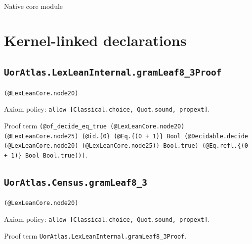 \documentclass[11pt]{article}
\begin{document}
\begin{center}{\LARGE Native core module}\end{center}
\section*{Kernel-linked declarations}
\subsection*{\texttt{UorAtlas.LexLeanInternal.gramLeaf8\_3Proof}}
\noindent\texttt{(@LexLeanCore.node20)}\par
\noindent Axiom policy: \texttt{allow [Classical.choice, Quot.sound, propext]}.\par
\noindent Proof term \texttt{(@of\_decide\_eq\_true (@LexLeanCore.node20) (@LexLeanCore.node25) (@id.\{0\} (@Eq.\{(0 + 1)\} Bool (@Decidable.decide (@LexLeanCore.node20) (@LexLeanCore.node25)) Bool.true) (@Eq.refl.\{(0 + 1)\} Bool Bool.true)))}.\par
\subsection*{\texttt{UorAtlas.Census.gramLeaf8\_3}}
\noindent\texttt{(@LexLeanCore.node20)}\par
\noindent Axiom policy: \texttt{allow [Classical.choice, Quot.sound, propext]}.\par
\noindent Proof term \texttt{UorAtlas.LexLeanInternal.gramLeaf8\_3Proof}.\par
\end{document}
